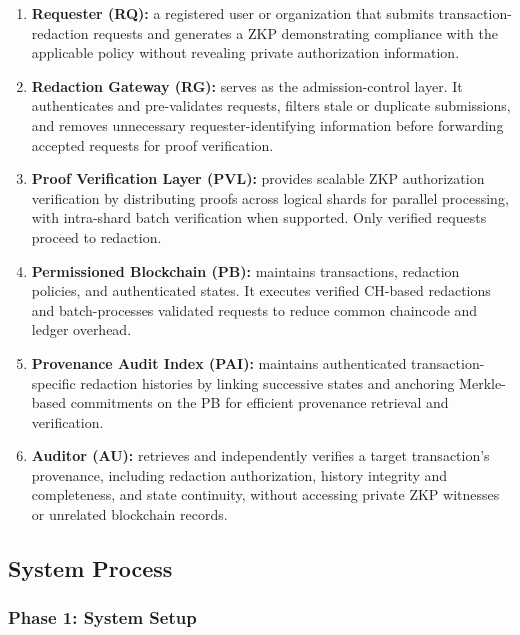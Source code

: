 \documentclass[lettersize,journal]{IEEEtran}
\begin{document}
\begin{enumerate}

\item \textbf{Requester (RQ):} a registered user or organization that submits transaction-redaction requests and generates a ZKP demonstrating compliance with the applicable policy without revealing private authorization information.

\item \textbf{Redaction Gateway (RG):} serves as the admission-control layer. It authenticates and pre-validates requests, filters stale or duplicate submissions, and removes unnecessary requester-identifying information before forwarding accepted requests for proof verification.

\item \textbf{Proof Verification Layer (PVL):} provides scalable ZKP authorization verification by distributing proofs across logical shards for parallel processing, with intra-shard batch verification when supported. Only verified requests proceed to redaction.

\item \textbf{Permissioned Blockchain (PB):} maintains transactions, redaction policies, and authenticated states. It executes verified CH-based redactions and batch-processes validated requests to reduce common chaincode and ledger overhead.

\item \textbf{Provenance Audit Index (PAI):} maintains authenticated transaction-specific redaction histories by linking successive states and anchoring Merkle-based commitments on the PB for efficient provenance retrieval and verification.

\item \textbf{Auditor (AU):} retrieves and independently verifies a target transaction's provenance, including redaction authorization, history integrity and completeness, and state continuity, without accessing private ZKP witnesses or unrelated blockchain records.

\end{enumerate}


\subsection{System Process}

\subsubsection*{\textbf{Phase 1: System Setup}}
\label{sec:phase1}
\end{document}
